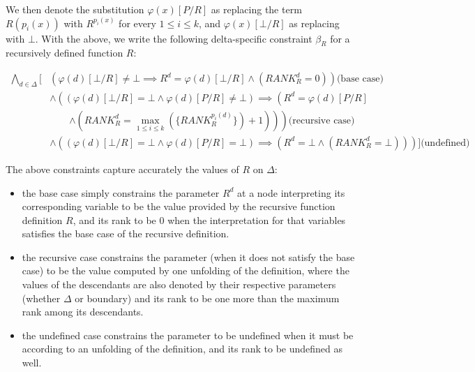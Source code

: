 We then denote the substitution $\varphi(x)[P/R]$ as replacing the term $R(p_i(x))$ with $R^{p_i(x)}$ for every $1\leq{} i \leq{}k$, and $\varphi(x)[\bot{}/R]$ as replacing with $\bot{}$.
With the above, we write the following delta-specific constraint $\beta_{R}$ for a recursively defined function $R$:

\begin{align*}
\bigwedge\limits_{d \in{} \Delta} \big\lbrack{} & \left( \varphi{}(d)[\bot{}/R] \neq{} \bot{} \implies{} R^{d} = \varphi{}(d)[\bot{}/R] \land{} \left(\textit{RANK}_{R}^{d} = 0\right) \right)\textrm{(base case)}\\
&\land{}  \left( \left( \varphi{}(d)[\bot{}/R] = \bot{} \land{} \varphi{}(d)[P/R] \neq{} \bot{}  \right) \implies{} \left( R^{d} = \varphi{}(d)[P/R] \right.\right.\\
&\qquad{} \left.\left. \land{} \left(\textit{RANK}_{R}^{d} = \max\limits_{1 \leq{} i \leq{} k}(\{\textit{RANK}_{R}^{p_i(d)} \}) + 1 \right)\right)  \right) \textrm{(recursive case)}\\
& \land{}  \left( \left( \varphi{}(d)[\bot{}/R] = \bot{} \land{} \varphi{}(d)[P/R] = \bot{} \right) \implies{} \left( R^{d} = \bot{} \land{} \left(\textit{RANK}_{R}^{d} = \bot{} \right)\right) \right) \big\rbrack{} \textrm{(undefined)}
\end{align*}

The above constraints capture accurately the values of $R$ on $\Delta{}$:
\begin{itemize}
\item{} the base case simply constrains the parameter $R^{d}$ at a node interpreting its corresponding variable to be the value provided by the recursive function definition $R$, and its rank to be $0$ when the interpretation for that variables satisfies the base case of the recursive definition.

\item{} the recursive case constrains the parameter (when it does not satisfy the base case) to be the value computed by one unfolding of the definition, where the values of the descendants are also denoted by their respective parameters (whether $\Delta{}$ or boundary) and its rank to be one more than the maximum rank among its descendants.

\item{} the undefined case constrains the parameter to be undefined when it must be according to an unfolding of the definition, and its rank to be undefined as well.
\end{itemize}

